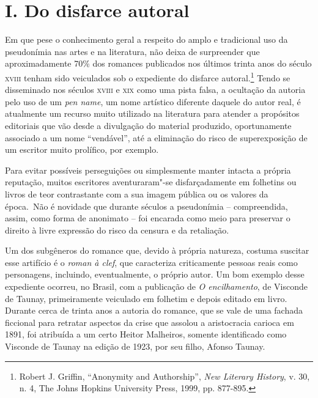 

\section*{I. Do disfarce autoral}

Em que pese o conhecimento geral a respeito do amplo e tradicional uso
da pseudonímia nas artes e na literatura, não deixa de surpreender que
aproximadamente 70\% dos romances publicados nos últimos trinta anos do
século \textsc{xviii} tenham sido veiculados sob o expediente do
disfarce autoral.\footnote{Robert J. Griffin, ``Anonymity and
  Authorship'', \emph{New Literary History}, v. 30, n. 4, The Johns
  Hopkins University Press, 1999, pp. 877-895.} Tendo se disseminado nos
séculos \textsc{xviii} e \textsc{xix} como uma pista falsa, a ocultação
da autoria pelo uso de um \emph{pen name}, um nome artístico diferente
daquele do autor real, é atualmente um recurso muito utilizado na
literatura para atender a propósitos editoriais que vão desde a
divulgação do material produzido, oportunamente associado a um nome
``vendável'', até a eliminação do risco de superexposição de um escritor
muito prolífico, por exemplo.

Para evitar possíveis perseguições ou simplesmente manter intacta a
própria reputação, muitos escritores aventuraram"-se disfarçadamente em
folhetins ou livros de teor contrastante com a sua imagem pública ou os
valores da época.~Não é novidade que durante séculos a pseudonímia --
compreendida, assim, como forma de anonimato -- foi encarada como meio
para preservar o direito à livre expressão do risco da censura e da
retaliação.

Um dos subgêneros do romance que, devido à própria natureza, costuma
suscitar esse artifício é o \emph{roman à clef}, que caracteriza
criticamente pessoas reais como personagens, incluindo, eventualmente, o
próprio autor. Um bom exemplo desse expediente ocorreu, no Brasil, com a
publicação de \emph{O encilhamento}, de Visconde de Taunay,
primeiramente veiculado em folhetim e depois editado em livro. Durante
cerca de trinta anos a autoria do romance, que se vale de uma fachada
ficcional para retratar aspectos da crise que assolou a aristocracia
carioca em 1891, foi atribuída a um certo Heitor Malheiros, somente
identificado como Visconde de Taunay na edição de 1923, por seu filho,
Afonso Taunay.

